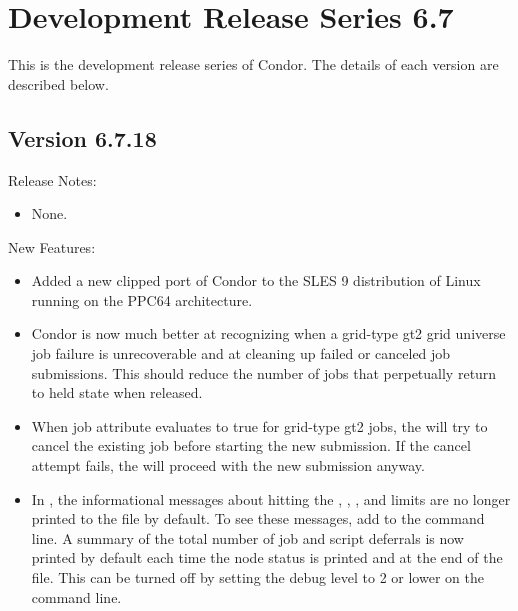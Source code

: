 \section{\label{sec:History-6-7}Development Release Series 6.7}

This is the development release series of Condor.
The details of each version are described below.

\subsection*{\label{sec:New-6-7.18}Version 6.7.18}

\noindent Release Notes:

\begin{itemize}

\item None.

\end{itemize}

\noindent New Features:

\begin{itemize}

\item Added a new clipped port of Condor to the SLES 9 distribution of
Linux running on the PPC64 architecture.

\item Condor is now much better at recognizing when a grid-type gt2 grid
universe job failure is unrecoverable and at cleaning up failed or canceled
job submissions. This should reduce the number of jobs
that perpetually return to held state when released.

\item When job attribute  evaluates to true for
grid-type gt2 jobs, the
 will try to cancel the existing job before starting
the new submission. If the cancel attempt fails, the 
will proceed with the new submission anyway.

\item In , the informational messages about hitting
the , , , and 
limits are no longer printed to the  file by default.
To see these messages, add  to the 
command line.  A summary of the total number of job and script deferrals
is now printed by default each time the node status is printed and at
the end of the  file.  This can be turned off by
setting the debug level to 2 or lower on the  
command line.

\end{itemize}

